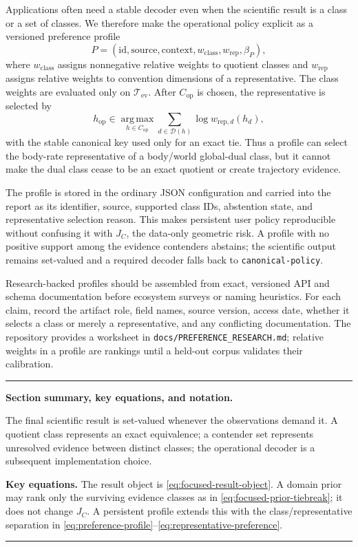 \documentclass[11pt]{article}
\newcommand{\argmax}{\operatorname*{arg\,max}}
\newenvironment{sectionrecap}
{\par\medskip\begingroup\small\noindent\rule{\linewidth}{0.4pt}\par
\smallskip\noindent\textbf{Section summary, key equations, and notation.}\par\smallskip}
{\par\smallskip\noindent\rule{\linewidth}{0.4pt}\par\endgroup\medskip}
\begin{document}
    Applications often need a stable decoder even when the scientific result is a class or
    a set of classes. We therefore make the operational policy explicit as a versioned
    preference profile
    \begin{equation}
        P=(\mathrm{id},\mathrm{source},\mathrm{context},
        w_{\mathrm{class}},w_{\mathrm{rep}},\beta_P),
        \label{eq:preference-profile}
    \end{equation}
    where $w_{\mathrm{class}}$ assigns nonnegative relative weights to quotient classes
    and $w_{\mathrm{rep}}$ assigns relative weights to convention dimensions of a
    representative. The class weights are evaluated only on
    $\mathcal T_{\mathrm{ev}}$. After $C_{\mathrm{op}}$ is chosen, the representative is
    selected by
    \begin{equation}
        h_{\mathrm{op}}
        \in \argmax_{h\in C_{\mathrm{op}}}
        \sum_{d\in\mathcal D(h)}\log w_{\mathrm{rep},d}(h_d),
        \label{eq:representative-preference}
    \end{equation}
    with the stable canonical key used only for an exact tie. Thus a profile can select
    the body-rate representative of a body/world global-dual class, but it cannot make the
    dual class cease to be an exact quotient or create trajectory evidence.

    The profile is stored in the ordinary JSON configuration and carried into the report
    as its identifier, source, supported class IDs, abstention state, and representative
    selection reason. This makes persistent user policy reproducible without confusing it
    with $J_C$, the data-only geometric risk. A profile with no positive support among the
    evidence contenders abstains; the scientific output remains set-valued and a required
    decoder falls back to \texttt{canonical-policy}.

    Research-backed profiles should be assembled from exact, versioned API and schema
    documentation before ecosystem surveys or naming heuristics. For each claim, record
    the artifact role, field names, source version, access date, whether it selects a class
    or merely a representative, and any conflicting documentation. The repository
    provides a worksheet in \texttt{docs/PREFERENCE\_RESEARCH.md}; relative weights in a
    profile are rankings until a held-out corpus validates their calibration.

    \begin{sectionrecap}
        The final scientific result is set-valued whenever the observations demand it. A quotient
        class represents an exact equivalence; a contender set represents unresolved evidence
        between distinct classes; the operational decoder is a subsequent implementation choice.

        \noindent\textbf{Key equations.}
        The result object is \eqref{eq:focused-result-object}. A domain prior may rank only the
        surviving evidence classes as in \eqref{eq:focused-prior-tiebreak}; it does not change
        $J_C$. A persistent profile extends this with the class/representative separation in
        \eqref{eq:preference-profile}--\eqref{eq:representative-preference}.
    \end{sectionrecap}
\end{document}
